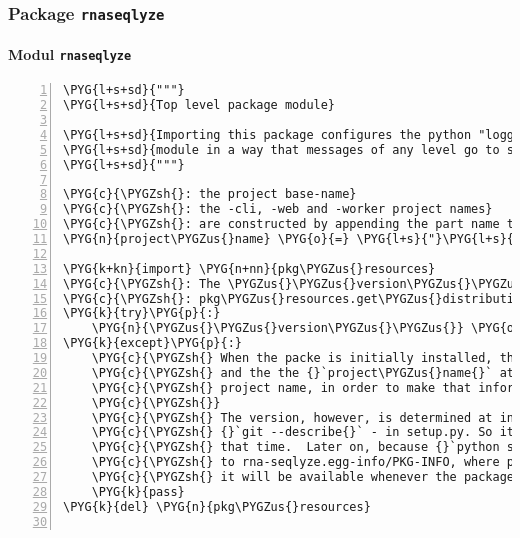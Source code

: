 \subsubsection{Package \texttt{rnaseqlyze}}
\label{rnaseqlyze-pdf:package-rnaseqlyze}\label{rnaseqlyze-pdf::doc}

\paragraph{Modul \texttt{rnaseqlyze}}
\label{rnaseqlyze-pdf:modul-rnaseqlyze}
\begin{Verbatim}[commandchars=\\\{\},numbers=left,firstnumber=1,stepnumber=5]
\PYG{l+s+sd}{"""}
\PYG{l+s+sd}{Top level package module}

\PYG{l+s+sd}{Importing this package configures the python "logging"}
\PYG{l+s+sd}{module in a way that messages of any level go to sys.stderr.}
\PYG{l+s+sd}{"""}

\PYG{c}{\PYGZsh{}: the project base-name}
\PYG{c}{\PYGZsh{}: the -cli, -web and -worker project names}
\PYG{c}{\PYGZsh{}: are constructed by appending the part name to this one}
\PYG{n}{project\PYGZus{}name} \PYG{o}{=} \PYG{l+s}{"}\PYG{l+s}{rna-seqlyze}\PYG{l+s}{"}

\PYG{k+kn}{import} \PYG{n+nn}{pkg\PYGZus{}resources}
\PYG{c}{\PYGZsh{}: The \PYGZus{}\PYGZus{}version\PYGZus{}\PYGZus{} property is set automatically set to the value of}
\PYG{c}{\PYGZsh{}: pkg\PYGZus{}resources.get\PYGZus{}distribution(project\PYGZus{}name).version on module import time.}
\PYG{k}{try}\PYG{p}{:}
    \PYG{n}{\PYGZus{}\PYGZus{}version\PYGZus{}\PYGZus{}} \PYG{o}{=} \PYG{n}{pkg\PYGZus{}resources}\PYG{o}{.}\PYG{n}{get\PYGZus{}distribution}\PYG{p}{(}\PYG{n}{project\PYGZus{}name}\PYG{p}{)}\PYG{o}{.}\PYG{n}{version}
\PYG{k}{except}\PYG{p}{:}
    \PYG{c}{\PYGZsh{} When the packe is initially installed, this module is imported by setup.py}
    \PYG{c}{\PYGZsh{} and the the {}`project\PYGZus{}name{}` attribute defined above is used to set the}
    \PYG{c}{\PYGZsh{} project name, in order to make that information non-redundant.}
    \PYG{c}{\PYGZsh{}}
    \PYG{c}{\PYGZsh{} The version, however, is determined at install/build time by running}
    \PYG{c}{\PYGZsh{} {}`git --describe{}` - in setup.py. So it doesn't matter if it is not set at}
    \PYG{c}{\PYGZsh{} that time.  Later on, because {}`python setup.py install/develop{}` writes it}
    \PYG{c}{\PYGZsh{} to rna-seqlyze.egg-info/PKG-INFO, where pkg\PYGZus{}resources picks it up,}
    \PYG{c}{\PYGZsh{} it will be available whenever the package is imported.}
    \PYG{k}{pass}
\PYG{k}{del} \PYG{n}{pkg\PYGZus{}resources}


\end{Verbatim}
